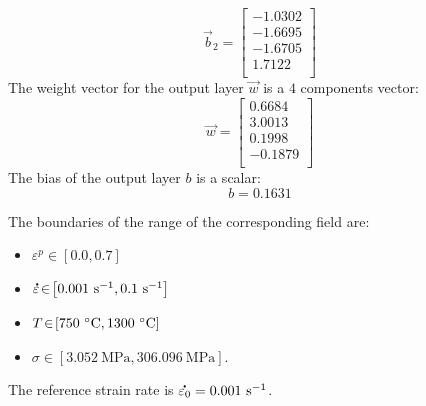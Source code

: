 \documentclass[algorithms,article,submit,pdftex,moreauthors]{Definitions/mdpi}
\DeclareRobustCommand{\mdot}[1]{\accentset{\mbox{\bfseries .}}{#1}}
\DeclareRobustCommand{\ps}{\text{s}^{-1}}
\DeclareRobustCommand{\MPa}{\text{MPa}}
\begin{document}
\begin{equation*}
\overrightarrow{b}_2 = \left[
\begin{array}{r}
-1.0302\\ 
-1.6695\\ 
-1.6705\\ 
1.7122\\ 
\end{array}\right]
\end{equation*}
The weight vector for the output layer $\overrightarrow{w}$ is a $4$ components vector:
\begin{equation*}
\overrightarrow{w} = \left[
\begin{array}{r}
0.6684\\ 
3.0013\\ 
0.1998\\ 
-0.1879\\ 
\end{array}\right]
\end{equation*}
The bias of the output layer $b$ is a scalar:
\begin{equation*}
b = 0.1631
\end{equation*}

The boundaries of the range of the corresponding field are:
\begin{itemize}
\item $\varepsilon^p\!\in\!\left[0.0,0.7\right]$
\item $\mdot{\varepsilon}\!\in\!\left[0.001~\ps,0.1~\ps\right]$
\item $T\!\in\!\left[750~\celsius,1300~\celsius\right]$
\item $\sigma\!\in\!\left[3.052~\MPa,306.096~\MPa\right]$.
\end{itemize}
The reference strain rate is $\mdot{\varepsilon_0} = 0.001~\ps$.








%
\end{document}
